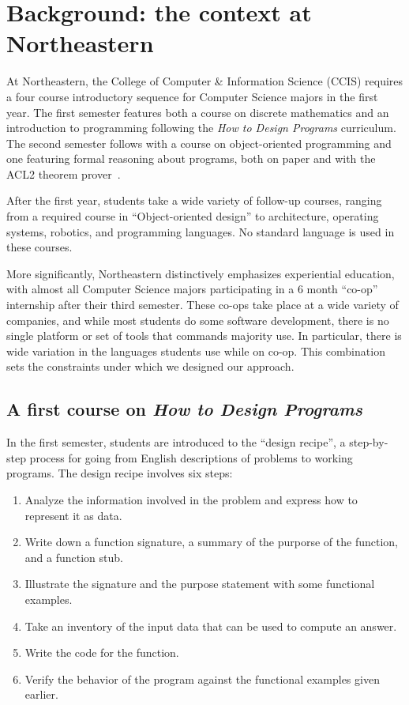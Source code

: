 \documentclass[submission,copyright]{eptcs}
\begin{document}
\section{Background: the context at Northeastern}
\label{sec:background}

At Northeastern, the College of Computer \& Information Science (CCIS)
requires a four course introductory sequence for Computer Science majors in the first year.  The
first semester features both a course on discrete mathematics and
 an introduction to programming following the \emph{How to Design
  Programs} curriculum.  The second semester follows with a course on
object-oriented programming and one featuring formal reasoning about
programs, both on paper and with the ACL2 theorem
prover~\cite{dvanhorn:Kaufmann2000ComputerAided}.

After the first year, students take a wide variety of
follow-up courses, ranging from a required course in ``Object-oriented
design'' to architecture, operating systems, robotics, and programming
languages.  No standard language is used in these courses.  

More significantly, Northeastern distinctively emphasizes experiential
education, with almost all Computer Science majors participating in a
6 month ``co-op'' internship after their third semester.  These co-ops
take place at a wide variety of companies, and while most students do
some software development, there is no single platform or
set of tools that commands majority use.
In particular, there is wide variation in the languages students use
while on co-op. This combination sets the constraints under which we
designed our approach.

\subsection{A first course on \emph{How to Design Programs}}

In the first semester, students are introduced to the ``design
recipe'', a step-by-step process for going from English descriptions
of problems to working programs.  The design recipe involves six steps:
\begin{enumerate}
\item Analyze the information involved in the problem and express
  how to represent it as data.
\item Write down a function signature, a summary of the purporse
  of the function, and a function stub.
\item Illustrate the signature and the purpose statement with some
  functional examples.
\item Take an inventory of the input data that can be used to compute
  an answer.
\item Write the code for the function.
\item Verify the behavior of the program against the functional
  examples given earlier.
\end{enumerate}
\end{document}
